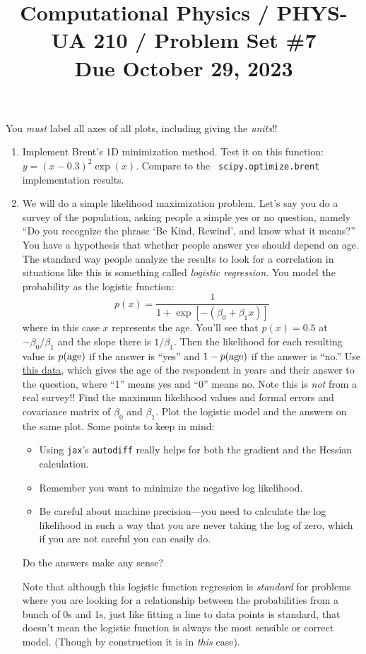 \documentclass[11pt, preprint]{aastex}
\begin{document}
\title{\bf Computational Physics / PHYS-UA 210 / Problem Set \#7
\\ Due October 29, 2023 }

You {\it must} label all axes of all plots, including giving the {\it
  units}!!

\begin{enumerate}
\item Implement Brent's 1D minimization method. Test it on this
function: $y= (x -0.3)^2 \exp(x)$. Compare to the {\tt
scipy.optimize.brent} implementation results.
\item We will do a simple likelihood maximization problem. Let's say
  you do a survey of the population, asking people a simple yes or no
  question, namely ``Do you recognize the phrase `Be Kind, Rewind',
  and know what it means?'' You have a hypothesis that whether people
  answer yes should depend on age. The standard way people analyze the
  results to look for a correlation in situations like this is
  something called {\it logistic regression.} You model the
  probability as the logistic function:
  \begin{equation}
    p(x) = \frac{1}{1+ \exp\left[-(\beta_0 + \beta_1 x)\right]}
  \end{equation}
  where in this case $x$ represents the age.  You'll see that
  $p(x)=0.5$ at $-\beta_0/\beta_1$ and the slope there is $1/\beta_1$.
  Then the likelihood for each resulting value is $p({\rm age})$ if
  the answer is ``yes'' and $1 - p({\rm age})$ if the answer is
  ``no.''  Use
  \href{https://github.com/blanton144/computational-grad/blob/main/data/survey.csv}{this
    data}, which gives the age of the respondent in years and their
  answer to the question, where ``1'' means yes and ``0'' means
  no. Note this is {\it not} from a real survey!!  Find the maximum
  likelihood values and formal errors and covariance matrix of
  $\beta_0$ and $\beta_1$. Plot the logistic model and the answers on
  the same plot. Some points to keep in mind:
  \begin{itemize}
    \item Using {\tt jax}'s {\tt autodiff} really helps for both the
      gradient and the Hessian calculation. 
    \item Remember you want to minimize the negative log likelihood.
    \item Be careful about machine precision---you need to calculate
      the log likelihood in such a way that you are never taking the
      log of zero, which if you are not careful you can easily do.
  \end{itemize}
  Do the answers make any sense?

  Note that although this logistic function regression is {\it
    standard} for problems where you are looking for a relationship
  between the probabilities from a bunch of 0s and 1s, just like
  fitting a line to data points is standard, that doesn't mean the
  logistic function is always the most sensible or correct model.
  (Though by construction it is in {\it this} case).
\end{enumerate}
\end{document}
